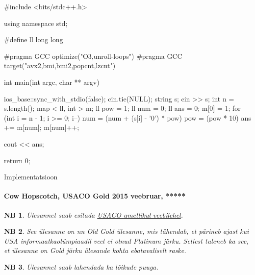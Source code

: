 \documentclass{trkut}
\newtheorem*{extra}{NB}
\begin{document}
\begin{cclol}
#include <bits/stdc++.h>

using namespace std;

#define ll long long

#pragma GCC optimize("O3,unroll-loops")
#pragma GCC target("avx2,bmi,bmi2,popcnt,lzcnt")

int main(int argc, char ** argv) {
  ios_base::sync_with_stdio(false);
  cin.tie(NULL);
  string s;
  cin >> s;
  int n = s.length();
  map < ll, int > m;
  ll pow = 1;
  ll num = 0;
  ll ans = 0;
  m[0] = 1;
  for (int i = n - 1; i >= 0; i--) {
    num = (num + (s[i] - '0') * pow) %
    pow = (pow * 10) %
    ans += m[num];
    m[num]++;
  }

  cout << ans;

  return 0;
}
\end{cclol}
\begin{kk}[H]
\caption{Implementatsioon}%
\end{kk}



\paragraph{Cow Hopscotch, USACO Gold 2015 veebruar, *****}
\begin{extra}
Ülesannet saab esitada \href{http://www.usaco.org/index.php?cpid=532&page=viewproblem2}{USACO ametlikul veebilehel}.
\end{extra}
\begin{extra}
See ülesanne on nn Old Gold ülesanne, mis tähendab, et pärineb ajast kui USA informaatkaolümpiaadil veel ei olnud Platinum järku. Sellest tuleneb ka see, et ülesanne on Gold järku ülesande kohta ebatavaliselt raske.
\end{extra}
\begin{extra}
Ülesannet saab lahendada ka lõikude puuga.
\end{extra}
\end{document}
